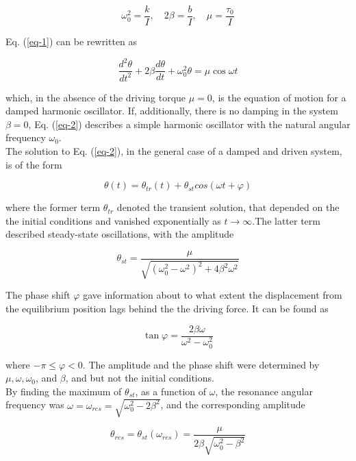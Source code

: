 \documentclass{article}
\begin{document}
$$\omega_0^2=\dfrac{k}{I},\quad 2\beta=\dfrac{b}{I},\quad \mu=\dfrac{\tau_0}{I}$$

Eq. (\ref{eq-1}) can be rewritten as

\begin{equation}\label{eq-2}
\dfrac{d^2\theta}{dt^2}+2\beta\dfrac{d\theta}{dt}+\omega_0^2\theta=\mu\cos\omega t
\end{equation}

which, in the absence of the driving torque $\mu=0$, is the equation of motion for a damped harmonic oscillator. If, additionally, there is no damping in the system $\beta=0$, Eq. (\ref{eq-2}) describes a simple harmonic oscillator with the natural angular frequency $\omega_0$.
\\

The solution to Eq. (\ref{eq-2}), in the general case of a damped and driven system, is of the form

\begin{equation}\label{eq-3}
\theta(t)=\theta_{tr}(t)+\theta_{st}cos(\omega t+\varphi)
\end{equation}

where the former term $\theta_{tr}$ denoted the transient solution, that depended on the the initial conditions and vanished exponentially as $t\rightarrow\infty$.The latter term described steady-state oscillations, with the amplitude

\begin{equation}\label{eq-4}
\theta_{st}=\frac{\mu}{\sqrt{(\omega_0^2-\omega^2)^2+4\beta^2\omega^2}}
\end{equation}

The phase shift $\varphi$ gave information about to what extent the displacement from the equilibrium position lags behind the the driving force. It can be found as

$$\tan\varphi=\frac{2\beta\omega}{\omega^2-\omega_0^2}$$

where $ -\pi\le\varphi<0 $. The amplitude and the phase shift were determined by $ \mu, \omega, \omega_0 $, and $ \beta $, and but not the initial conditions.
\\

By finding the maximum of $ \theta_{st} $, as a function of $ \omega $, the resonance angular frequency was $ \omega=\omega_{res}=\sqrt{\omega_0^2-2\beta^2} $, and the corresponding amplitude 

$$ \theta_{res}=\theta_{st}(\omega_{res})=\dfrac{\mu}{2\beta\sqrt{\omega_0^2-\beta^2}} $$
\end{document}
